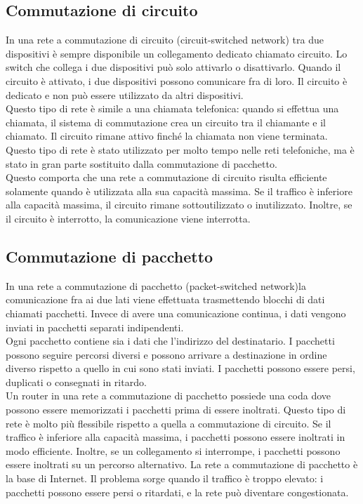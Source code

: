 \documentclass[12pt]{report}
\begin{document}
	\subsection{Commutazione di circuito}
	In una rete a commutazione di circuito (circuit-switched network) tra due dispositivi è sempre disponibile un collegamento dedicato chiamato circuito. Lo switch che collega i due dispositivi può solo attivarlo o disattivarlo. Quando il circuito è attivato, i due dispositivi possono comunicare fra di loro. Il circuito è dedicato e non può essere utilizzato da altri dispositivi. 
	\vspace{\baselineskip}\\
	Questo tipo di rete è simile a una chiamata telefonica: quando si effettua una chiamata, il sistema di commutazione crea un circuito tra il chiamante e il chiamato. Il circuito rimane attivo finché la chiamata non viene terminata. Questo tipo di rete è stato utilizzato per molto tempo nelle reti telefoniche, ma è stato in gran parte sostituito dalla commutazione di pacchetto. 
	\vspace{\baselineskip}\\
	Questo comporta che una rete a commutazione di circuito risulta efficiente solamente quando è utilizzata alla sua capacità massima. Se il traffico è inferiore alla capacità massima, il circuito rimane sottoutilizzato o inutilizzato. Inoltre, se il circuito è interrotto, la comunicazione viene interrotta.

	\subsection{Commutazione di pacchetto}
	In una rete a commutazione di pacchetto (packet-switched network)la comunicazione fra ai due lati viene effettuata trasmettendo blocchi di dati chiamati pacchetti. Invece di avere una comunicazione continua, i dati vengono inviati in pacchetti separati indipendenti. 
	\vspace{\baselineskip}\\
	Ogni pacchetto contiene sia i dati che l'indirizzo del destinatario. I pacchetti possono seguire percorsi diversi e possono arrivare a destinazione in ordine diverso rispetto a quello in cui sono stati inviati. I pacchetti possono essere persi, duplicati o consegnati in ritardo. 
	\vspace{\baselineskip}\\
	Un router in una rete a commutazione di pacchetto possiede una coda dove possono essere memorizzati i pacchetti prima di essere inoltrati. Questo tipo di rete è molto più flessibile rispetto a quella a commutazione di circuito. Se il traffico è inferiore alla capacità massima, i pacchetti possono essere inoltrati in modo efficiente. Inoltre, se un collegamento si interrompe, i pacchetti possono essere inoltrati su un percorso alternativo. La rete a commutazione di pacchetto è la base di Internet. Il problema sorge quando il traffico è troppo elevato: i pacchetti possono essere persi o ritardati, e la rete può diventare congestionata.
\end{document}
